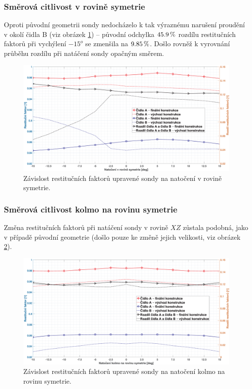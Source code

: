         \subsubsection{Směrová citlivost v rovině symetrie}
            Oproti původní geometrii sondy nedocházelo k tak výraznému narušení proudění v okolí čidla B (viz obrázek \ref{fig:sonda-final-symetrie}) – původní odchylka $45.9 \, \%$ rozdílu restitučních faktorů při vychýlení $-15^o$ se zmenšila na $9.85 \, \%$. Došlo rovněž k vyrovnání průběhu rozdílu při natáčení sondy opačným směrem.
            \begin{figure}[ht!]
                \centering
                \includegraphics*[width=\textwidth]{500_FINAL/final_XY.eps}
                \caption{Závislost restitučních faktorů upravené sondy na natočení v rovině symetrie.}
                \label{fig:sonda-final-symetrie}
            \end{figure}
        \newpage

        \subsubsection{Směrová citlivost kolmo na rovinu symetrie}
            Změna restitučních faktorů při natáčení sondy v rovině $XZ$ zůstala podobná, jako v případě původní geometrie (došlo pouze ke změně jejich velikosti, viz obrázek \ref{fig:sonda-final-kolma-rovina}).
            \begin{figure}[ht!]
                \centering
                \includegraphics*[width=\textwidth]{500_FINAL/final_XZ.eps}
                \caption{Závislost restitučních faktorů upravené sondy na natočení kolmo na rovinu symetrie.}
                \label{fig:sonda-final-kolma-rovina}
            \end{figure}

